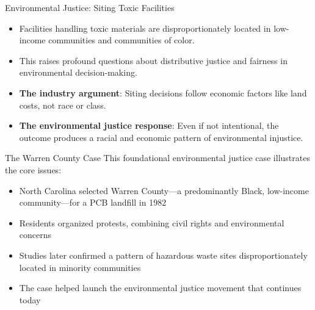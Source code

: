 \documentclass{beamer}
\begin{document}
	\begin{frame}{Environmental Justice: Siting Toxic Facilities}
		\begin{itemize}
			\item Facilities handling toxic materials are disproportionately located in low-income communities and communities of color.
			\item This raises profound questions about distributive justice and fairness in environmental decision-making.
			\item \textbf{The industry argument}: Siting decisions follow economic factors like land costs, not race or class.
			\item \textbf{The environmental justice response}: Even if not intentional, the outcome produces a racial and economic pattern of environmental injustice.
		\end{itemize}
		
		\begin{alertblock}{The Warren County Case}
			\scriptsize
			This foundational environmental justice case illustrates the core issues:
			\begin{itemize}
				\item North Carolina selected Warren County—a predominantly Black, low-income community—for a PCB landfill in 1982
				\item Residents organized protests, combining civil rights and environmental concerns
				\item Studies later confirmed a pattern of hazardous waste sites disproportionately located in minority communities
				\item The case helped launch the environmental justice movement that continues today
			\end{itemize}
		\end{alertblock}
	\end{frame}
	
\end{document}
